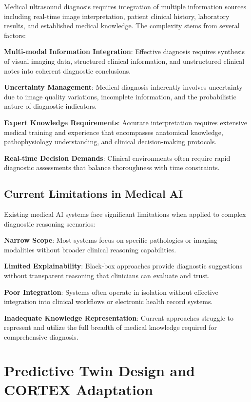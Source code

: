 Medical ultrasound diagnosis requires integration of multiple information sources including real-time image interpretation, patient clinical history, laboratory results, and established medical knowledge. The complexity stems from several factors:

\textbf{Multi-modal Information Integration}: Effective diagnosis requires synthesis of visual imaging data, structured clinical information, and unstructured clinical notes into coherent diagnostic conclusions.

\textbf{Uncertainty Management}: Medical diagnosis inherently involves uncertainty due to image quality variations, incomplete information, and the probabilistic nature of diagnostic indicators.

\textbf{Expert Knowledge Requirements}: Accurate interpretation requires extensive medical training and experience that encompasses anatomical knowledge, pathophysiology understanding, and clinical decision-making protocols.

\textbf{Real-time Decision Demands}: Clinical environments often require rapid diagnostic assessments that balance thoroughness with time constraints.

\subsection{Current Limitations in Medical AI}

Existing medical AI systems face significant limitations when applied to complex diagnostic reasoning scenarios:

\textbf{Narrow Scope}: Most systems focus on specific pathologies or imaging modalities without broader clinical reasoning capabilities.

\textbf{Limited Explainability}: Black-box approaches provide diagnostic suggestions without transparent reasoning that clinicians can evaluate and trust.

\textbf{Poor Integration}: Systems often operate in isolation without effective integration into clinical workflows or electronic health record systems.

\textbf{Inadequate Knowledge Representation}: Current approaches struggle to represent and utilize the full breadth of medical knowledge required for comprehensive diagnosis.

\section{Predictive Twin Design and CORTEX Adaptation}

